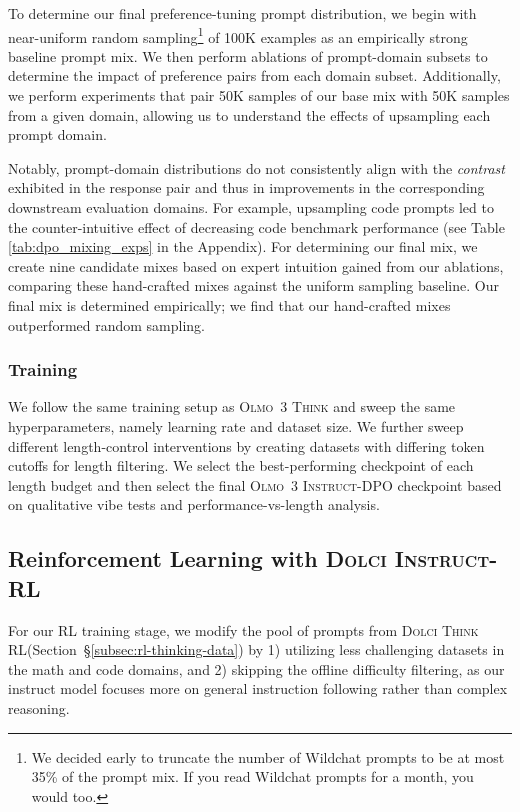 \documentclass[table]{ai2style/ai2}
\newcommand{\newOlmo}{Olmo\xspace}
\newcommand{\olmothreeinstruct}{\textsc{\newOlmo~3 Instruct}\xspace}
\newcommand{\olmothreethinking}{\textsc{Olmo~3 Think}\xspace}
\newcommand{\dolcithinkrl}{\textsc{Dolci Think RL}\xspace}
\newcommand{\dolciinstruct}{\textsc{Dolci Instruct}\xspace}
\begin{document}
{{To determine our final preference-tuning prompt distribution, we begin with near-uniform random sampling\footnote{We decided early to truncate the number of Wildchat prompts to be at most 35\% of the prompt mix. If you read Wildchat prompts for a month, you would too.} of 100K examples as an empirically strong baseline prompt mix. We then perform ablations of prompt-domain subsets to determine the impact of preference pairs from each domain subset. Additionally, we perform experiments that pair 50K samples of our base mix with 50K samples from a given domain, allowing us to understand the effects of upsampling each prompt domain.

Notably, prompt-domain distributions do not consistently align with the \textit{contrast} exhibited in the response pair and thus in improvements in the corresponding downstream evaluation domains. For example, upsampling code prompts led to the counter-intuitive effect of decreasing code benchmark performance (see Table \ref{tab:dpo_mixing_exps} in the Appendix). For determining our final mix, we create nine candidate mixes based on expert intuition gained from our ablations, comparing these hand-crafted mixes against the uniform sampling baseline. Our final mix is determined empirically; we find that our hand-crafted mixes outperformed random sampling.

\subsubsection{Training}
We follow the same training setup as \olmothreethinking and sweep the same hyperparameters, namely learning rate and dataset size. We further sweep different length-control interventions by creating datasets with differing token cutoffs for length filtering. We select the best-performing checkpoint of each length budget and then select the final \olmothreeinstruct-DPO checkpoint based on qualitative vibe tests and performance-vs-length analysis.

\subsection{Reinforcement Learning with \dolciinstruct-RL}
\label{sec:RLVR-instruct}

For our RL training stage, we modify the pool of prompts from \dolcithinkrl (Section~\S\ref{subsec:rl-thinking-data}) by 1) utilizing less challenging datasets in the math and code domains, and 2) skipping the offline difficulty filtering, as our instruct model focuses more on general instruction following rather than complex reasoning.

}}
\end{document}
